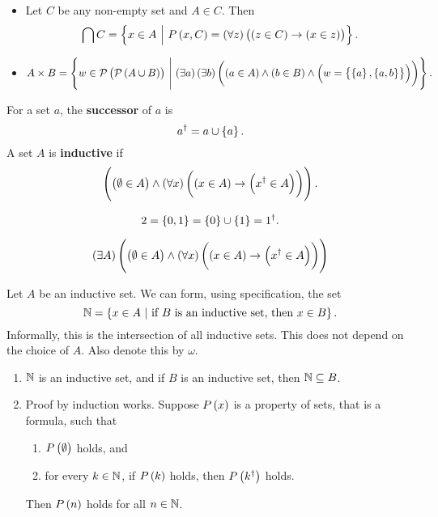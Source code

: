\begin{example*}
\hfill
\begin{itemize}
\item Let $ C $ be any non-empty set and $ A \in C $. Then
$$ \bigcap C = \cbr{x \in A \st P\br{x, C} = \fab{z}\impb{\inb{z}{C}}{\inb{x}{z}}}. $$
\item
$$ A \times B = \cbr{w \in \PPP\br{\PPP\br{A \cup B}} \st \teb{a}\teb{b}\br{\inb{a}{A} \land \inb{b}{B} \land \eqb{w}{\cbr{\cbr{a}, \cbr{a, b}}}}}. $$
\end{itemize}
\end{example*}

\begin{definition}
For a set $ a $, the \textbf{successor} of $ a $ is
$$ a^\dagger = a \cup \cbr{a}. $$
A set $ A $ is \textbf{inductive} if
$$ \andb{\inb{\emptyset}{A}}{\fab{x}\impb{\inb{x}{A}}{\inb{x^\dagger}{A}}}. $$
\end{definition}

\begin{example*}
$$ 2 = \cbr{0, 1} = \cbr{0} \cup \cbr{1} = 1^\dagger. $$
\end{example*}

\begin{axiom**}
$$ \teb{A}\andb{\inb{\emptyset}{A}}{\fab{x}\impb{\inb{x}{A}}{\inb{x^\dagger}{A}}} $$
\end{axiom**}

\begin{definition}
Let $ A $ be an inductive set. We can form, using specification, the set
$$ \NN = \cbr{x \in A \st \text{if} \ B \ \text{is an inductive set, then} \ x \in B}. $$
Informally, this is the intersection of all inductive sets. This does not depend on the choice of $ A $. Also denote this by $ \omega $.
\end{definition}

\begin{theorem}
\label{thm:3.2.3}
\hfill
\begin{enumerate}
\item $ \mathbb{N} $ is an inductive set, and if $ B $ is an inductive set, then $ \mathbb{N} \subseteq B $.
\item Proof by induction works. Suppose $ P\br{x} $ is a property of sets, that is a formula, such that
\begin{enumerate}
\item $ P\br{\emptyset} $ holds, and
\item for every $ k \in \mathbb{N} $, if $ P\br{k} $ holds, then $ P\br{k^\dagger} $ holds.
\end{enumerate}
Then $ P\br{n} $ holds for all $ n \in \mathbb{N} $.
\end{enumerate}
\end{theorem}

